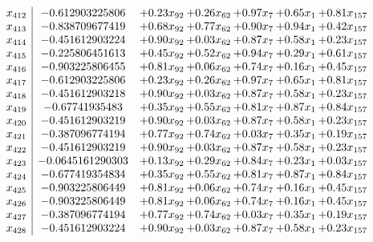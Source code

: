 \documentclass[8pt]{article}
\begin{document}
\[\begin{array}{c| c c@{\hskip 2pt} c@{\hskip 2pt} c@{\hskip 2pt} c@{\hskip 2pt} c@{\hskip 2pt} }
 x_{412}   &  -0.612903225806 & +  0.23 x_{92} & +  0.26 x_{62} & +  0.97 x_{7} & +  0.65 x_{1} & +  0.81 x_{157}\\
 x_{413}   &  -0.838709677419 & +  0.68 x_{92} & +  0.77 x_{62} & +  0.90 x_{7} & +  0.94 x_{1} & +  0.42 x_{157}\\
 x_{414}   &  -0.451612903224 & +  0.90 x_{92} & +  0.03 x_{62} & +  0.87 x_{7} & +  0.58 x_{1} & +  0.23 x_{157}\\
 x_{415}   &  -0.225806451613 & +  0.45 x_{92} & +  0.52 x_{62} & +  0.94 x_{7} & +  0.29 x_{1} & +  0.61 x_{157}\\
 x_{416}   &  -0.903225806455 & +  0.81 x_{92} & +  0.06 x_{62} & +  0.74 x_{7} & +  0.16 x_{1} & +  0.45 x_{157}\\
 x_{417}   &  -0.612903225806 & +  0.23 x_{92} & +  0.26 x_{62} & +  0.97 x_{7} & +  0.65 x_{1} & +  0.81 x_{157}\\
 x_{418}   &  -0.451612903218 & +  0.90 x_{92} & +  0.03 x_{62} & +  0.87 x_{7} & +  0.58 x_{1} & +  0.23 x_{157}\\
 x_{419}   &  -0.67741935483 & +  0.35 x_{92} & +  0.55 x_{62} & +  0.81 x_{7} & +  0.87 x_{1} & +  0.84 x_{157}\\
 x_{420}   &  -0.451612903219 & +  0.90 x_{92} & +  0.03 x_{62} & +  0.87 x_{7} & +  0.58 x_{1} & +  0.23 x_{157}\\
 x_{421}   &  -0.387096774194 & +  0.77 x_{92} & +  0.74 x_{62} & +  0.03 x_{7} & +  0.35 x_{1} & +  0.19 x_{157}\\
 x_{422}   &  -0.451612903219 & +  0.90 x_{92} & +  0.03 x_{62} & +  0.87 x_{7} & +  0.58 x_{1} & +  0.23 x_{157}\\
 x_{423}   &  -0.0645161290303 & +  0.13 x_{92} & +  0.29 x_{62} & +  0.84 x_{7} & +  0.23 x_{1} & +  0.03 x_{157}\\
 x_{424}   &  -0.677419354834 & +  0.35 x_{92} & +  0.55 x_{62} & +  0.81 x_{7} & +  0.87 x_{1} & +  0.84 x_{157}\\
 x_{425}   &  -0.903225806449 & +  0.81 x_{92} & +  0.06 x_{62} & +  0.74 x_{7} & +  0.16 x_{1} & +  0.45 x_{157}\\
 x_{426}   &  -0.903225806449 & +  0.81 x_{92} & +  0.06 x_{62} & +  0.74 x_{7} & +  0.16 x_{1} & +  0.45 x_{157}\\
 x_{427}   &  -0.387096774194 & +  0.77 x_{92} & +  0.74 x_{62} & +  0.03 x_{7} & +  0.35 x_{1} & +  0.19 x_{157}\\
 x_{428}   &  -0.451612903224 & +  0.90 x_{92} & +  0.03 x_{62} & +  0.87 x_{7} & +  0.58 x_{1} & +  0.23 x_{157}\\

\end{array}\]
\end{document}
